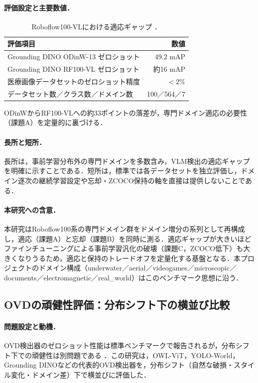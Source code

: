\paragraph{評価設定と主要数値．}
\begin{table}[h]
\centering
\begin{tabularx}{\linewidth}{Xr}
\hline
評価項目 & 数値 \\
\hline
Grounding DINO ODinW-13 ゼロショット & 49.2 mAP \\
Grounding DINO RF100-VL ゼロショット & 約16 mAP \\
医療画像データセットのゼロショット精度 & $< 2\%$ \\
データセット数／クラス数／ドメイン数 & 100／564／7 \\
\hline
\end{tabularx}
\caption{Roboflow100-VLにおける適応ギャップ \cite{rf100vl}．}
\label{tab:rf100vl}
\end{table}
ODinWからRF100-VLへの約33ポイントの落差が，専門ドメイン適応の必要性（課題A）を定量的に裏づける．

\paragraph{長所と短所．}
長所は，事前学習分布外の専門ドメインを多数含み，VLM検出の適応ギャップを明確に示すことである．短所は，標準では各データセットを独立評価し，ドメイン逐次の継続学習設定や忘却・ZCOCO保持の軸を直接は提供しないことである．

\paragraph{本研究への含意．}
本研究はRoboflow100系の専門ドメイン群をドメイン増分の系列として再構成し，適応（課題A）と忘却（課題B）を同時に測る．適応ギャップが大きいほどファインチューニングによる事前学習汎化の破壊（課題C，ZCOCO低下）も大きくなりうるため，適応と保持のトレードオフを定量化する基盤となる．本プロジェクトのドメイン構成（underwater／aerial／videogames／microscopic／documents／electromagnetic／real\_world）はこのベンチマーク思想に沿う．


\subsection{OVDの頑健性評価：分布シフト下の横並び比較}
\label{subsec:ovdrobust}

\paragraph{問題設定と動機．}
OVD検出器のゼロショット性能は標準ベンチマークで報告されるが，分布シフト下での頑健性は別問題である \cite{ovdrobust}．この研究は，OWL-ViT，YOLO-World，Grounding DINOなどの代表的OVD検出器を，分布シフト（自然な破損・スタイル変化・ドメイン差）下で横並びに評価した．

